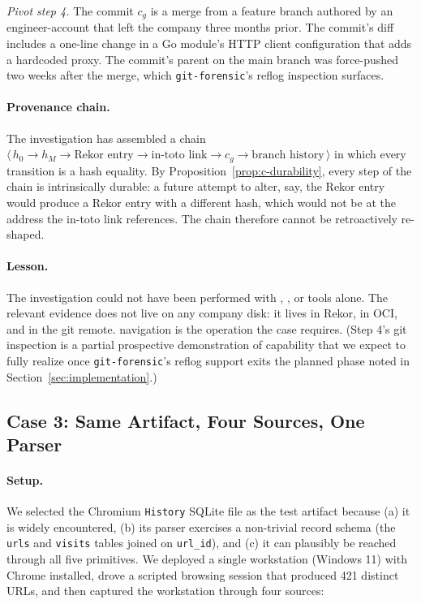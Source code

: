 \noindent\emph{Pivot step 4.} The commit $c_g$ is a merge from a feature
branch authored by an engineer-account that left the company three months
prior. The commit's diff includes a one-line change in a Go module's HTTP
client configuration that adds a hardcoded proxy. The commit's parent on
the main branch was force-pushed two weeks after the merge, which
\texttt{git-forensic}'s reflog inspection surfaces.

\paragraph{Provenance chain.}
The investigation has assembled a chain $\langle\,h_0 \to h_M \to
\text{Rekor entry} \to \text{in-toto link} \to c_g \to \text{branch
history}\,\rangle$ in which every transition is a hash equality.
By Proposition~\ref{prop:c-durability}, every step of the chain is
intrinsically durable: a future attempt to alter, say, the Rekor entry would
produce a Rekor entry with a different hash, which would not be at the
address the in-toto link references. The chain therefore cannot be
retroactively re-shaped.

\paragraph{Lesson.}
The investigation could not have been performed with , , or
 tools alone. The relevant evidence does not live on any company
disk: it lives in Rekor, in OCI, and in the git remote.  navigation
is the operation the case requires. (Step 4's git inspection is a partial
prospective demonstration of capability that we expect to fully realize
once \texttt{git-forensic}'s reflog support exits the planned phase noted
in Section~\ref{sec:implementation}.)

\subsection{Case 3: Same Artifact, Four Sources, One Parser}
\label{sec:case3}

\paragraph{Setup.}
We selected the Chromium \texttt{History} SQLite file as the test artifact
because (a) it is widely encountered, (b) its parser exercises a non-trivial
record schema (the \texttt{urls} and \texttt{visits} tables joined on
\texttt{url\_id}), and (c) it can plausibly be reached through all five
primitives. We deployed a single workstation (Windows 11) with Chrome
installed, drove a scripted browsing session that produced 421 distinct
URLs, and then captured the workstation through four sources:

